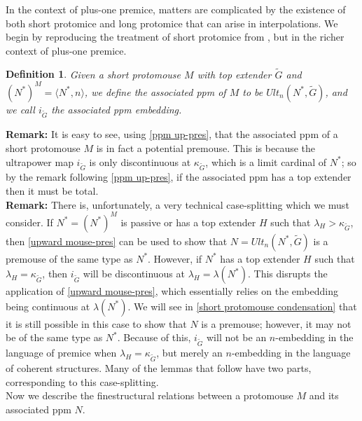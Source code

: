 \documentclass[12pt]{article}
\newtheorem{defn}[thm]{Definition}
\begin{document}
In the context of plus-one premice, matters are complicated by the existence of both short protomice and long protomice that can arise in interpolations.  We begin by reproducing the treatment of short protomice from \cite{zeman square proof}, but in the richer context of plus-one premice.\\


\begin{defn} \label{short associated ppm}
Given a short protomouse $M$ with top extender $\tilde{G}$ and $(N^*)^M = \langle N^* , n \rangle$, we define the associated ppm of $M$ to be $Ult_n (N^* , \tilde{G} )$, and we call $i_{\tilde{G}}$ the associated ppm embedding.
\end{defn}

\textbf{Remark:} It is easy to see, using \ref{ppm up-pres}, that the associated ppm of a short protomouse $M$ is in fact a potential premouse.  This is because the ultrapower map $i_{\tilde{G}}$ is only discontinuous at $\kappa_{\tilde{G}}$, which is a limit cardinal of $N^*$; so by the remark following \ref{ppm up-pres}, if the associated ppm has a top extender then it must be total.\\






\textbf{Remark:} There is, unfortunately, a very technical case-splitting which we must consider.  If $N^* = (N^*)^M$ is passive or has a top extender $H$ such that $\lambda_H > \kappa_{\tilde{G}}$, then \ref{upward mouse-pres} can be used to show that $N = Ult_n (N^* , \tilde{G} )$ is a premouse of the same type as $N^*$.  However, if $N^*$ has a top extender $H$ such that $\lambda_H = \kappa_{\tilde{G}}$, then $i_{\tilde{G}}$ will be discontinuous at $\lambda_H = \lambda (N^*)$.  This disrupts the application of \ref{upward mouse-pres}, which essentially relies on the embedding being continuous at $\lambda (N^*)$.  We will see in \ref{short protomouse condensation} that it is still possible in this case to show that $N$ is a premouse; however, it may not be of the same type as $N^*$.  Because of this, $i_{\tilde{G}}$ will not be an $n$-embedding in the language of premice when $\lambda_H = \kappa_{\tilde{G}}$, but merely an $n$-embedding in the language of coherent structures.  Many of the lemmas that follow have two parts, corresponding to this case-splitting.\\




Now we describe the finestructural relations between a protomouse $M$ and its associated ppm $N$.\\
\end{document}
